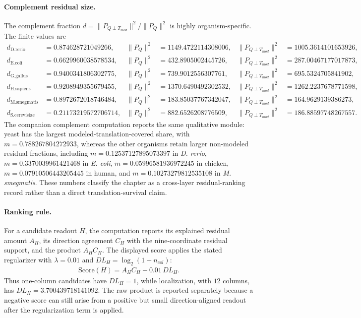 \paragraph{Complement residual size.}
The complement fraction $d=\lVert P_{Q\perp T_{mod}}\rVert^2/\lVert P_Q\rVert^2$ is highly organism-specific.  The finite values are
$$
\begin{aligned}
 d_{\mathrm{D.rerio}}&=0.874628721049266, & \lVert P_Q\rVert^2&=1149.4722114308006, & \lVert P_{Q\perp T_{mod}}\rVert^2&=1005.3614101653926,\\
 d_{\mathrm{E.coli}}&=0.6629960038578534, & \lVert P_Q\rVert^2&=432.8905002445726, & \lVert P_{Q\perp T_{mod}}\rVert^2&=287.00467177017873,\\
 d_{\mathrm{G.gallus}}&=0.9400341806302775, & \lVert P_Q\rVert^2&=739.9012556307761, & \lVert P_{Q\perp T_{mod}}\rVert^2&=695.5324705841902,\\
 d_{\mathrm{H.sapiens}}&=0.9208949355679455, & \lVert P_Q\rVert^2&=1370.6490492302532, & \lVert P_{Q\perp T_{mod}}\rVert^2&=1262.2237678771598,\\
 d_{\mathrm{M.smegmatis}}&=0.8972672018746484, & \lVert P_Q\rVert^2&=183.85037767342047, & \lVert P_{Q\perp T_{mod}}\rVert^2&=164.9629139386273,\\
 d_{\mathrm{S.cerevisiae}}&=0.21173219572706714, & \lVert P_Q\rVert^2&=882.6526208776509, & \lVert P_{Q\perp T_{mod}}\rVert^2&=186.88597748267557.
\end{aligned}
$$
The companion complement computation reports the same qualitative module: yeast has the largest modeled-translation-covered share, with $m=0.788267804272933$, whereas the other organisms retain larger non-modeled residual fractions, including $m=0.12537127895073397$ in \emph{D. rerio}, $m=0.3370039961421468$ in \emph{E. coli}, $m=0.05996581936972245$ in chicken, $m=0.07910506443205445$ in human, and $m=0.10273279812535108$ in \emph{M. smegmatis}.  These numbers classify the chapter as a cross-layer residual-ranking record rather than a direct translation-survival claim.

\paragraph{Ranking rule.}
For a candidate readout $H$, the computation reports its explained residual amount $A_H$, its direction agreement $C_H$ with the nine-coordinate residual support, and the product $A_HC_H$.  The displayed score applies the stated regularizer with $\lambda=0.01$ and $DL_H=\log_2(1+n_{col})$:
$$
\begin{aligned}
 \mathrm{Score}(H) = A_H C_H - 0.01\,DL_H.
\end{aligned}
$$
Thus one-column candidates have $DL_H=1$, while localization, with $12$ columns, has $DL_H=3.700439718141092$.  The raw product is reported separately because a negative score can still arise from a positive but small direction-aligned readout after the regularization term is applied.

